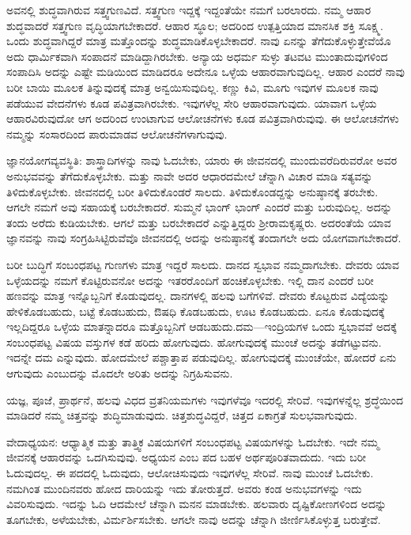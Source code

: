 ಅವನಲ್ಲಿ ಶುದ್ಧವಾಗಿರುವ ಸತ್ತ್ವಗುಣವಿದೆ. ಸತ್ತ್ವಗುಣ ಇದ್ದಕ್ಕೆ ಇದ್ದಂತೆಯೇ ನಮಗೆ ಬರಲಾರದು. ನಮ್ಮ ಆಹಾರ ಶುದ್ಧವಾದರೆ ಸತ್ತ್ವಗುಣ ವೃದ್ಧಿಯಾಗಬೇಕಾದರೆ. ಆಹಾರ ಸ್ಥೂಲ; ಅದರಿಂದ ಉತ್ಪತ್ತಿಯಾದ ಮಾನಸಿಕ ಶಕ್ತಿ ಸೂಕ್ಷ್ಮ. ಒಂದು ಶುದ್ಧವಾಗಿದ್ದರೆ ಮಾತ್ರ ಮತ್ತೊಂದನ್ನು ಶುದ್ಧಮಾಡಿಕೊಳ್ಳಬೇಕಾದರೆ. ನಾವು ಏನನ್ನು ತೆಗೆದುಕೊಳ್ಳುತ್ತೇವೆಯೊ ಅದು ಧಾರ್ಮಿಕವಾಗಿ ಸಂಪಾದನೆ ಮಾಡಿದ್ದಾಗಿರಬೇಕು. ಅನ್ಯಾಯ ಅಧರ್ಮ ಸುಳ್ಳು ತಟವಟ ಮುಂತಾದುವುಗಳಿಂದ ಸಂಪಾದಿಸಿ ಅದನ್ನು ಎಷ್ಟೇ ಮಡಿಯಿಂದ ಮಾಡಿದರೂ ಅದೇನೂ ಒಳ್ಳೆಯ ಆಹಾರವಾಗುವುದಿಲ್ಲ. ಆಹಾರ ಎಂದರೆ ನಾವು ಬರೀ ಬಾಯಿ ಮೂಲಕ ತಿನ್ನುವುದಕ್ಕೆ ಮಾತ್ರ ಅನ್ವಯಿಸುವುದಿಲ್ಲ. ಕಣ್ಣು ಕಿವಿ, ಮೂಗು ಇವುಗಳ ಮೂಲಕ ನಾವು ಪಡೆಯುವ ವೇದನೆಗಳು ಕೂಡ ಪವಿತ್ರವಾಗಿರಬೇಕು. ಇವುಗಳೆಲ್ಲ ಸೇರಿ ಆಹಾರವಾಗುವುದು. ಯಾವಾಗ ಒಳ್ಳೆಯ ಆಹಾರವಿರುವುದೋ ಆಗ ಅದರಿಂದ ಉಂಟಾಗುವ ಆಲೋಚನೆಗಳು ಕೂಡ ಪವಿತ್ರವಾಗಿರುವುವು. ಈ ಆಲೋಚನೆಗಳು ನಮ್ಮನ್ನು ಸಂಸಾರದಿಂದ ಪಾರುಮಾಡವ ಆಲೋಚನೆಗಳಾಗುವುವು.

ಜ್ಞಾನಯೋಗವ್ಯವಸ್ಥಿತಿ: ಶಾಸ್ತ್ರಾದಿಗಳನ್ನು ನಾವು ಓದಬೇಕು, ಯಾರು ಈ ಜೀವನದಲ್ಲಿ ಮುಂದುವರೆದಿರುವರೋ ಅವರ ಅನುಭವವನ್ನು ತೆಗೆದುಕೊಳ್ಳಬೇಕು. ಮತ್ತು ನಾವೇ ಅದರ ಆಧಾರದಮೇಲೆ ಚೆನ್ನಾಗಿ ವಿಚಾರ ಮಾಡಿ ಸತ್ಯವನ್ನು ತಿಳಿದುಕೊಳ್ಳಬೇಕು. ಜೀವನದಲ್ಲಿ ಬರೀ ತಿಳಿದುಕೊಂಡರೆ ಸಾಲದು. ತಿಳಿದುಕೊಂಡದ್ದನ್ನು ಅನುಷ್ಠಾನಕ್ಕೆ ತರಬೇಕು. ಆಗಲೇ ನಮಗೆ ಅವು ಸಹಾಯಕ್ಕೆ ಬರಬೇಕಾದರೆ. ಸುಮ್ಮನೆ ಭಾಂಗ್ ಭಾಂಗ್ ಎಂದರೆ ಮತ್ತು ಬರುವುದಿಲ್ಲ. ಅದನ್ನು ತಂದು ಅರೆದು ಕುಡಿಯಬೇಕು. ಆಗಲೆ ಮತ್ತು ಬರಬೇಕಾದರೆ ಎನ್ನುತ್ತಿದ್ದರು ಶ‍್ರೀರಾಮಕೃಷ್ಣರು. ಅದರಂತೆಯೆ ಯಾವ ಜ್ಞಾನವನ್ನು ನಾವು ಸಂಗ್ರಹಿಸಿಟ್ಟಿರುವೆವೊ ಜೀವನದಲ್ಲಿ ಅದನ್ನು ಅನುಷ್ಠಾನಕ್ಕೆ ತಂದಾಗಲೇ ಅದು ಯೋಗವಾಗಬೇಕಾದರೆ.

ಬರೀ ಬುದ್ಧಿಗೆ ಸಂಬಂಧಪಟ್ಟ ಗುಣಗಳು ಮಾತ್ರ ಇದ್ದರೆ ಸಾಲದು. ದಾನದ ಸ್ವಭಾವ ನಮ್ಮದಾಗಬೇಕು. ದೇವರು ಯಾವ ಒಳ್ಳೆಯದನ್ನು ನಮಗೆ ಕೊಟ್ಟಿರುವನೋ ಅದನ್ನು ಇತರರೊಂದಿಗೆ ಹಂಚಿಕೊಳ್ಳಬೇಕು. ಇಲ್ಲಿ ದಾನ ಎಂದರೆ ಬರೀ ಹಣವನ್ನು ಮಾತ್ರ ಇನ್ನೊಬ್ಬನಿಗೆ ಕೊಡುವುದಲ್ಲ. ದಾನಗಳಲ್ಲಿ ಹಲವು ಬಗೆಗಳಿವೆ. ದೇವರು ಕೊಟ್ಟರುವ ವಿದ್ಯೆಯನ್ನು ಹೇಳಿಕೊಡಬಹುದು, ಬಟ್ಟೆ ಕೊಡಬಹುದು, ಔಷಧಿ ಕೊಡಬಹುದು, ಊಟ ಕೊಡಬಹುದು. ಏನೂ ಕೊಡುವುದಕ್ಕೆ ಇಲ್ಲದಿದ್ದರೂ ಒಳ್ಳೆಯ ಮಾತನ್ನಾದರೂ ಮತ್ತೊಬ್ಬನಿಗೆ ಆಡಬಹುದು.\break ದಮ—ಇಂದ್ರಿಯಗಳ ಒಂದು ಸ್ವಭಾವವೆ ಅದಕ್ಕೆ ಸಂಬಂಧಪಟ್ಟ ವಿಷಯ ವಸ್ತುಗಳ ಕಡೆ ಹರಿದು ಹೋಗುವುದು. ಹೋಗುವುದಕ್ಕೆ ಮುಂಚೆ ಅದನ್ನು ತಡೆಗಟ್ಟುವನು. ಇದನ್ನೇ ದಮ ಎನ್ನುವುದು. ಹೋದಮೇಲೆ ಪಶ್ಚಾತ್ತಾಪ ಪಡುವುದಿಲ್ಲ. ಹೋಗುವುದಕ್ಕೆ ಮುಂಚೆಯೇ, ಹೋದರೆ ಏನು ಆಗುವುದು ಎಂಬುದನ್ನು ಮೊದಲೇ ಅರಿತು ಅದನ್ನು ನಿಗ್ರಹಿಸುವನು.

ಯಜ್ಞ, ಪೂಜೆ, ಪ್ರಾರ್ಥನೆ, ಹಲವು ವಿಧದ ವ್ರತನಿಯಮಗಳು ಇವುಗಳೆವೂ ಇದರಲ್ಲಿ ಸೇರಿವೆ. ಇವುಗಳನ್ನೆಲ್ಲ ಶ್ರದ್ಧೆಯಿಂದ ಮಾಡಿದರೆ ನಮ್ಮ ಚಿತ್ತವನ್ನು ಶುದ್ಧಿಮಾಡುವುದು. ಚಿತ್ತಶುದ್ಧ\-ವಿದ್ದರೆ, ಚಿತ್ತದ ಏಕಾಗ್ರತೆ ಸುಲಭವಾಗುವುದು.

ವೇದಾಧ್ಯಯನ: ಆಧ್ಯಾತ್ಮಿಕ ಮತ್ತು ತಾತ್ತ್ವಿಕ ವಿಷಯಗಳಿಗೆ ಸಂಬಂಧಪಟ್ಟ ವಿಷಯಗಳನ್ನು ಓದಬೇಕು. ಇದೇ ನಮ್ಮ ಜೀವನಕ್ಕೆ ಆಹಾರವನ್ನು ಒದಗಿಸುವುವು. ಅಧ್ಯಯನ ಎಂಬ ಪದ ಬಹಳ ಅರ್ಥಪೂರಿತವಾದುದು. ಇದು ಬರೀ ಓದುವುದಲ್ಲ. ಈ ಪದದಲ್ಲಿ ಓದುವುದು, ಆಲೋಚಿಸುವುದು ಇವುಗಳೆಲ್ಲ ಸೇರಿವೆ. ನಾವು ಮುಂಚೆ ಓದಬೇಕು. ನಮಗಿಂತ ಮುಂದಿನವರು ಹೋದ ದಾರಿಯನ್ನು ಇದು ತೋರುತ್ತದೆ. ಅವರು ಕಂಡ ಅನುಭವಗಳನ್ನು ಇದು ವಿವರಿಸುವುದು. ಇದನ್ನು ಓದಿ ಆದಮೇಲೆ ಚೆನ್ನಾಗಿ ಮನನ ಮಾಡಬೇಕು. ಹಲವಾರು ದೃಷ್ಟಿಕೋಣಗಳಿಂದ ಅದನ್ನು ತೂಗಬೇಕು, ಅಳೆಯಬೇಕು, ವಿರ್ಮರ್ಶಿಸಬೇಕು. ಆಗಲೇ ನಾವು ಅದನ್ನು ಚೆನ್ನಾಗಿ ಜೀರ್ಣಿಸಿಕೊಳ್ಳುತ್ತ ಬರುತ್ತೇವೆ.

